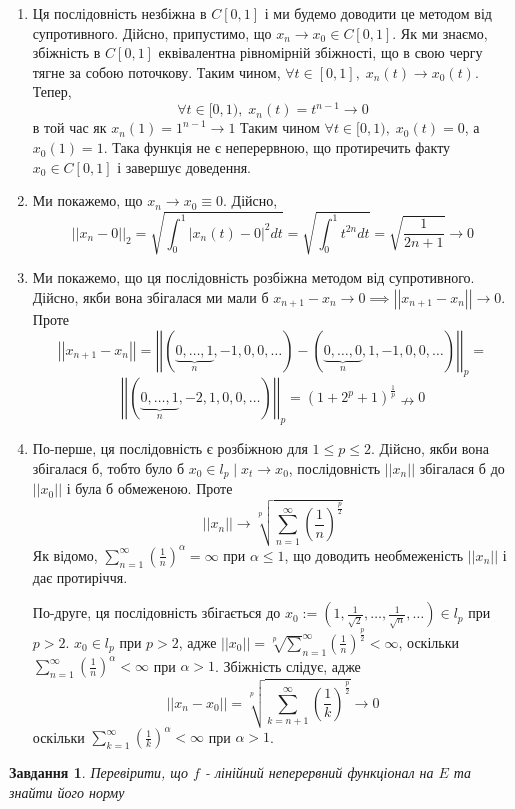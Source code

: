 \documentclass[12pt]{article} %
\newcommand{\mynorm}[1]{\left|\left|#1\right|\right|}
\newcommand{\myabs}[1]{\left|#1\right|}
\newtheorem{prob}{Завдання}
\begin{document}
	\begin{enumerate}
		\item{Ця послідовність незбіжна в $C[0,1]$ і ми будемо доводити це методом від супротивного. Дійсно,
			припустимо, що $x_n\to x_0\in C[0,1]$. Як ми знаємо, збіжність в $C[0,1]$ еквівалентна
			рівномірній збіжності, що в свою чергу тягне за собою поточкову. Таким чином,
			$\forall t\in[0,1],\; x_n(t)\to x_0(t)$. Тепер,
			\[\forall t\in[0,1),\; x_n(t)=t^{n-1}\to 0\]
			в той час як
			$x_n(1)=1^{n-1}\to 1$
			Таким чином $\forall t\in[0,1),\; x_0(t)=0$, а $x_0(1)=1$. Така
			функція не є неперервною, що протиречить факту $x_0\in C[0,1]$ і завершує доведення.}
		\item{Ми покажемо, що $x_n\to x_0\equiv 0$. Дійсно,
			\[\mynorm{x_n-0}_2=\sqrt{\int_0^1 \myabs{x_n(t)-0}^2dt}=\sqrt{\int_0^1 t^{2n}dt}=\sqrt{\frac{1}{2n+1}}\to 0\]
			}
		\item{Ми покажемо, що ця послідовність розбіжна методом від супротивного. Дійсно, якби вона збігалася ми мали б $x_{n+1}-x_n\to 0
			\implies \mynorm{x_{n+1}-x_n}\to 0$. Проте
			\[\mynorm{x_{n+1}-x_n}=\mynorm{(\underbrace{0,\dots,1}_n
			,-1,0,0,\dots)-(\underbrace{0,\dots,0}_{n}
			,1,-1,0,0,\dots)
			}_p=
			\]\[\mynorm{(\underbrace{0,\dots,1}_n
			,-2,1,0,0,\dots)}_p=\left(1+2^p+1\right)^{\frac{1}{p}}\nrightarrow  0\]
			}
		\item{По-перше, ця послідовність є розбіжною для $1\leq p\leq 2$. Дійсно, якби вона збігалася б, тобто було б $x_0\in l_p\mid
			x_t\to x_0$, послідовність $\mynorm{x_n}$ збігалася б до $\mynorm{x_0}$ і була б обмеженою. Проте
			\[\mynorm{x_n}\to\sqrt[p]{\sum_{n=1}^\infty (\frac{1}{n})^{\frac{p}{2}}}\]
			Як відомо, $\sum_{n=1}^\infty (\frac{1}{n})^\alpha=\infty$ при $\alpha\leq 1$, що доводить необмеженість $\mynorm{x_n}$
			і дає протиріччя.
			
			По-друге, ця послідовність збігається до $x_0:=(1,\frac{1}{\sqrt{2}},\dots,\frac{1}{\sqrt{n}},\dots)\in l_p$
			при $p>2$. $x_0\in l_p$ при $p>2$, адже
			$\mynorm{x_0}=\sqrt[p]\sum_{n=1}^\infty (\frac{1}{n})^{\frac{p}{2}}<\infty$, оскільки 
			$\sum_{n=1}^\infty (\frac{1}{n})^\alpha<\infty$ при $\alpha>1$.
			Збіжність слідує, адже
			\[\mynorm{x_n-x_0}=\sqrt[p]{\sum_{k=n+1}^\infty (\frac{1}{k})^{\frac{p}{2}}}\to 0\]
			оскільки 
			$\sum_{k=1}^\infty (\frac{1}{k})^\alpha<\infty$ при $\alpha>1$.
			}
	\end{enumerate}
\begin{prob}
	Перевірити, що $f$ - лінійний неперервний функціонал на $E$ та знайти його норму
\end{prob}
\end{document}

